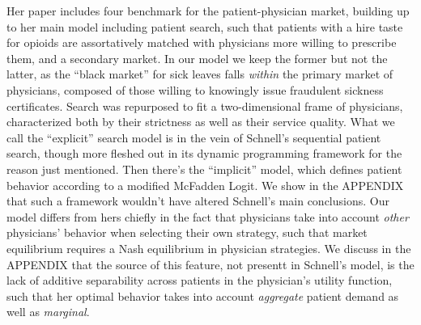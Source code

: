 \documentclass[../main.tex]{subfiles}
\begin{document}
Her paper includes four benchmark for the patient-physician market, building up to her main model including patient search, such that patients with a hire taste for opioids are assortatively matched with physicians more willing to prescribe them, and a secondary market. In our model we keep the former but not the latter, as the ``black market'' for sick leaves falls \textit{within} the primary market of physicians, composed of those willing to knowingly issue fraudulent sickness certificates. Search was repurposed to fit a two-dimensional frame of physicians, characterized both by their strictness as well as their service quality. What we call the ``explicit'' search model is in the vein of Schnell's sequential patient search, though more fleshed out in its dynamic programming framework for the reason just mentioned. Then there's the ``implicit'' model, which defines patient behavior according to a modified McFadden Logit. We show in the APPENDIX that such a framework wouldn't have altered Schnell's main conclusions. Our model differs from hers chiefly in the fact that physicians take into account \textit{other} physicians' behavior when selecting their own strategy, such that market equilibrium requires a Nash equilibrium in physician strategies. We discuss in the APPENDIX that the source of this feature, not presentt in Schnell's model, is the lack of additive separability across patients in the physician's utility function, such that her optimal behavior takes into account \textit{aggregate} patient demand as well as \textit{marginal}.
\end{document}
